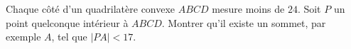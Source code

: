 Chaque côté d'un quadrilatère convexe $ABCD$ mesure moins de $24$. Soit $P$ un point quelconque intérieur à $ABCD$. Montrer qu'il existe un sommet, par exemple $A$, tel que $|PA| < 17$.
